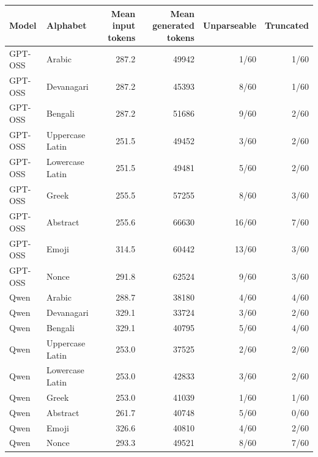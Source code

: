 \begin{tabular}{llrrrr}
\toprule
Model & Alphabet & Mean input tokens & Mean generated tokens & Unparseable & Truncated\\
\midrule
GPT-OSS & Arabic & 287.2 & 49942 & 1/60 & 1/60 \\
GPT-OSS & Devanagari & 287.2 & 45393 & 8/60 & 1/60 \\
GPT-OSS & Bengali & 287.2 & 51686 & 9/60 & 2/60 \\
GPT-OSS & Uppercase Latin & 251.5 & 49452 & 3/60 & 2/60 \\
GPT-OSS & Lowercase Latin & 251.5 & 49481 & 5/60 & 2/60 \\
GPT-OSS & Greek & 255.5 & 57255 & 8/60 & 3/60 \\
GPT-OSS & Abstract & 255.6 & 66630 & 16/60 & 7/60 \\
GPT-OSS & Emoji & 314.5 & 60442 & 13/60 & 3/60 \\
GPT-OSS & Nonce & 291.8 & 62524 & 9/60 & 3/60 \\
Qwen & Arabic & 288.7 & 38180 & 4/60 & 4/60 \\
Qwen & Devanagari & 329.1 & 33724 & 3/60 & 2/60 \\
Qwen & Bengali & 329.1 & 40795 & 5/60 & 4/60 \\
Qwen & Uppercase Latin & 253.0 & 37525 & 2/60 & 2/60 \\
Qwen & Lowercase Latin & 253.0 & 42833 & 3/60 & 2/60 \\
Qwen & Greek & 253.0 & 41039 & 1/60 & 1/60 \\
Qwen & Abstract & 261.7 & 40748 & 5/60 & 0/60 \\
Qwen & Emoji & 326.6 & 40810 & 4/60 & 2/60 \\
Qwen & Nonce & 293.3 & 49521 & 8/60 & 7/60 \\
\bottomrule
\end{tabular}
